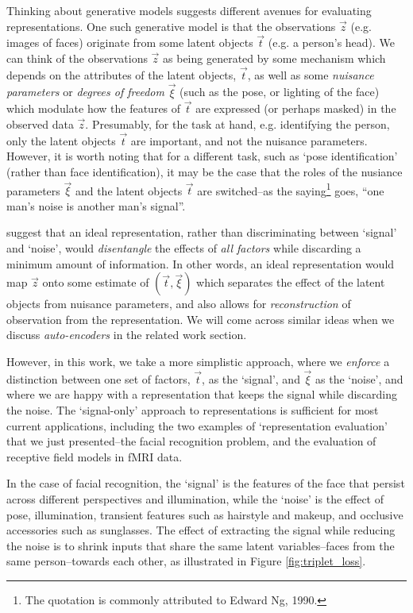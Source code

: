 
Thinking about generative models suggests different avenues for
evaluating representations.  One such generative model is that the
observations $\vec{z}$ (e.g. images of faces) originate from some
latent objects $\vec{t}$ (e.g. a person's head).  We can think of the
observations $\vec{z}$ as being generated by some mechanism which
depends on the attributes of the latent objects, $\vec{t}$, as well as
some \emph{nuisance parameters} or \emph{degrees of freedom}
$\vec{\xi}$ (such as the pose, or lighting of the face) which modulate
how the features of $\vec{t}$ are expressed (or perhaps masked) in the
observed data $\vec{z}$.  Presumably, for the task at hand,
e.g. identifying the person, only the latent objects $\vec{t}$ are
important, and not the nuisance parameters.  However, it is worth
noting that for a different task, such as `pose identification'
(rather than face identification), it may be the case that the roles
of the nusiance parameters $\vec{\xi}$ and the latent objects
$\vec{t}$ are switched--as the saying\footnote{The quotation is
  commonly attributed to Edward Ng, 1990.} goes, ``one man's noise
is another man's signal''.

\cite{bengio2013representation} suggest that an ideal representation,
rather than discriminating between `signal' and `noise', would
\emph{disentangle} the effects of \emph{all factors} while discarding
a minimum amount of information.  In other words, an ideal
representation would map $\vec{z}$ onto some estimate of $(\vec{t},
\vec{\xi})$ which separates the effect of the latent objects from
nuisance parameters, and also allows for \emph{reconstruction} of
observation from the representation.  We will come across similar
ideas when we discuss \emph{auto-encoders} in the related work
section.

However, in this work, we take a more simplistic approach, where we
\emph{enforce} a distinction between one set of factors, $\vec{t}$, as
the `signal', and $\vec{\xi}$ as the `noise', and where we are happy
with a representation that keeps the signal while discarding the
noise. The `signal-only' approach to representations is sufficient for
most current applications, including the two examples of
`representation evaluation' that we just presented--the facial
recognition problem, and the evaluation of receptive field models in
fMRI data.

In the case of facial recognition, the `signal' is the features of the
face that persist across different perspectives and illumination,
while the `noise' is the effect of pose, illumination, transient
features such as hairstyle and makeup, and occlusive accessories such
as sunglasses.  
The effect of extracting the signal while reducing the
noise is to shrink inputs that share the same latent variables--faces
from the same person--towards each other, as illustrated in Figure
\ref{fig:triplet_loss}.

